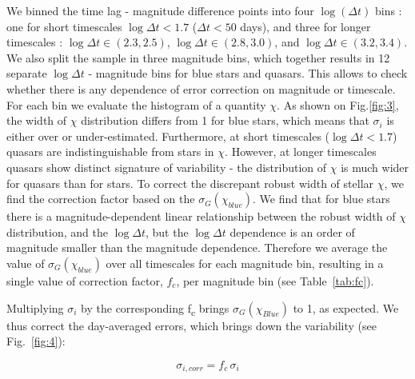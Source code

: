 \documentclass[fleqn,usenatbib]{mnras}  %
\begin{document}
We binned the time lag - magnitude difference points into four $\log (\Delta t ) $ bins : one for short timescales  $\log \Delta t < 1.7$ ($\Delta t < 50$ days), and three for longer timescales : $\log \Delta t \in (2.3,2.5)$, $\log \Delta t \in (2.8,3.0)$, and $\log \Delta t \in (3.2,3.4)$.  We also split the sample in three magnitude bins, which together results in 12 separate $\log\Delta t$ - magnitude bins for blue stars and quasars. This allows to check whether there is any dependence of error correction on magnitude or timescale.  For each bin we evaluate the histogram of a quantity $\chi$. As shown on Fig.\ref{fig:3}, the width of $\chi$ distribution differs from 1 for blue stars, which means that $\sigma_{i}$ is either over or under-estimated. Furthermore, at short timescales ($\log{\Delta t} < 1.7$) quasars are indistinguishable from stars in $\chi$. However, at longer timescales quasars show distinct signature of variability - the distribution of $\chi$ is much wider for quasars than for stars. To correct the discrepant robust width of stellar $\chi$, we find the correction factor based on the $\sigma_{G}(\chi_{blue})$.  We find that for blue stars there is a magnitude-dependent  linear relationship between the robust width of $\chi$ distribution, and the $\log{\Delta t}$, but the $\log{\Delta t}$ dependence is an order of magnitude smaller than the magnitude dependence. Therefore we average the value of  $\sigma_{G}(\chi_{blue})$   over all timescales for each magnitude bin, resulting in a single value of correction factor, $f_{c}$, per magnitude bin (see Table~\ref{tab:fc}).  


Multiplying  $\sigma_{i}$ by the corresponding f\textsubscript{c} brings  $\sigma_{G}(\chi_{Blue})$ to 1, as expected. We thus correct the day-averaged errors, which brings down the variability (see Fig.~\ref{fig:4}):

\begin{equation}
\sigma_{i,corr}  = f_{c} \, \sigma_{i}  
\end{equation} 
\end{document}
